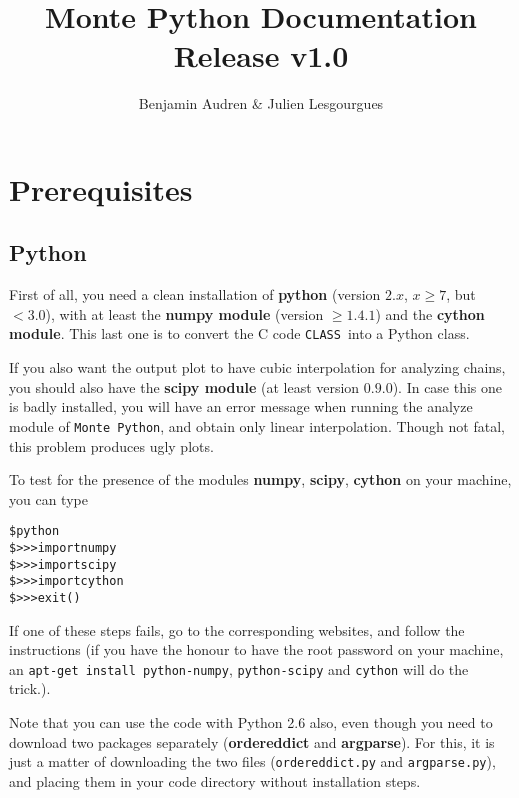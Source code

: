 \documentclass[10pt]{article}
\title{ {\huge \bf Monte Python Documentation}\\Release v1.0}
\author{Benjamin Audren \& Julien Lesgourgues}
\newcommand{\CLASS}{\texttt{CLASS}}
\newcommand{\MP}{\texttt{Monte Python}}
\begin{document}
\maketitle

\newpage

\tableofcontents

\newpage

\section{Prerequisites}

  \subsection{Python}

  First of all, you need a clean installation of {\bf python} (version $2.x$,
  $x\geq7$, but $<3.0$), with at least the {\bf numpy module} (version
  $\geq1.4.1$) and the {\bf cython module}. This last one is to convert the C
  code \CLASS~into a Python class.\par

  If you also want the output plot to have cubic interpolation for analyzing
  chains, you should also have the {\bf scipy module} (at least version $0.9.0$).
  In case this one is badly installed, you
  will have an error message when running the analyze module of \MP,
  and obtain only linear interpolation. Though not fatal, this problem produces
  ugly plots.\par

To test for the presence of the modules {\bf numpy},  {\bf scipy},  {\bf cython} on your machine, you can type
  \begin{alltt}
   \$ python
   \$ >>> import numpy
   \$ >>> import scipy
   \$ >>> import cython
   \$ >>> exit()
  \end{alltt}
 If one of these steps fails, go to the corresponding websites, and follow the instructions (if you have the honour to have the root password on your machine, an \verb?apt-get install python-numpy?, \verb?python-scipy? and \verb?cython? will do the trick.).

  Note that you can use the code with Python 2.6 also, even though you need to
  download two packages separately ({\bf ordereddict} and {\bf argparse}). For this, it is
  just a matter of downloading the two files (\verb?ordereddict.py? and \verb?argparse.py?),
  and placing them in your code directory without installation steps.\par
\end{document}
